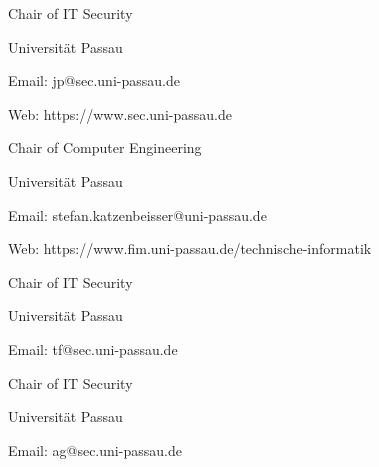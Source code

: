 
\newpage
{}\par

\vspace{0.8cm}

\par
Chair of IT Security\par
Universität Passau\par
Email: jp@sec.uni-passau.de\par
Web: https://www.sec.uni-passau.de\par

\vspace{0.8cm}

\par
Chair of Computer Engineering\par
Universität Passau\par
Email: stefan.katzenbeisser@uni-passau.de\par
Web: https://www.fim.uni-passau.de/technische-informatik\par

\vspace{0.9cm}

\par

\vspace{0.8cm}

\par
Chair of IT Security\par
Universität Passau\par
Email: tf@sec.uni-passau.de\par

\vspace{0.7cm}

\par
Chair of IT Security\par
Universität Passau\par
Email: ag@sec.uni-passau.de\par

